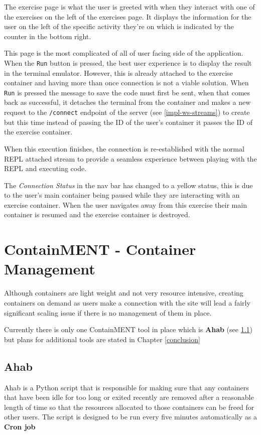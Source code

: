 The exercise page is what the user is greeted with when they interact with one of the exercises on the left of the exercises page. It displays the information for the user on the left of the specific activity they're on which is indicated by the counter in the bottom right. 

This page is the most complicated of all of user facing side of the application. When the \texttt{Run} button is pressed, the best user experience is to display the result in the terminal emulator. However, this is already attached to the exercise container and having more than once connection is not a viable solution. When \texttt{Run} is pressed the message to save the code must first be sent, when that comes back as successful, it detaches the terminal from the container and makes a new request to the \texttt{/connect} endpoint of the server (see \ref{impl-ws-streams}) to create but this time instead of passing the ID of the user's container it passes the ID of the exercise container.

When this execution finishes, the connection is re-established with the normal REPL attached stream to provide a seamless experience between playing with the REPL and executing code.

The \textit{Connection Status} in the nav bar has changed to a yellow status, this is due to the user's main container being paused while they are interacting with an exercise container. When the user navigates away from this exercise their main container is resumed and the exercise container is destroyed. 

\section{ContainMENT - Container Management}

Although containers are light weight and not very resource intensive, creating containers on demand as users make a connection with the site will lead a fairly significant scaling issue if there is no management of them in place.

Currently there is only one ContainMENT tool in place which is \textbf{Ahab} (see \ref{impl-ahab}) but plans for additional tools are stated in Chapter \ref{conclusion}

\subsection{Ahab} \label{impl-ahab}

Ahab is a Python script that is responsible for making sure that any containers that have been idle for too long or exited recently are removed after a reasonable length of time so that the resources allocated to those containers can be freed for other users. The script is designed to be run every five minutes automatically as a \textbf{Cron job}


